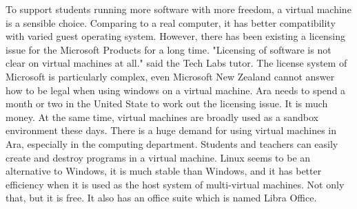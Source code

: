 To support students running more software with more freedom, a virtual machine is a sensible choice. Comparing to a real computer, it has better compatibility with varied guest operating system. However, there has been existing a licensing issue for the Microsoft Products for a long time. "Licensing of software is not clear on virtual machines at all." said the Tech Labs tutor. The license system of Microsoft is particularly complex, even Microsoft New Zealand cannot answer how to be legal when using windows on a virtual machine. Ara needs to spend a month or two in the United State to work out the licensing issue. It is much money. At the same time, virtual machines are broadly used as a sandbox environment these days. There is a huge demand for using virtual machines in Ara, especially in the computing department. Students and teachers can easily create and destroy programs in a virtual machine. Linux seems to be an alternative to Windows, it is much stable than Windows, and it has better efficiency when it is used as the host system of multi-virtual machines. Not only that, but it is free. It also has an office suite which is named Libra Office.
